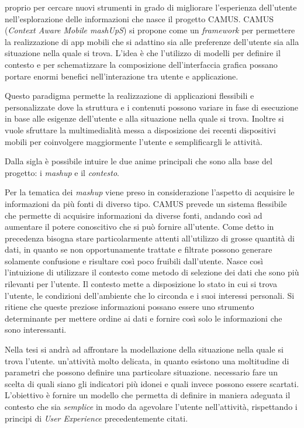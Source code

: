 \upe proprio per cercare nuovi strumenti in grado di migliorare l'esperienza dell'u\-ten\-te nell'esplorazione delle informazioni che nasce il progetto CAMUS. CAMUS (\emph{Context Aware Mobile mashUpS}) si propone come un \emph{framework} per permettere la realizzazione di app mobili che si adattino sia alle preferenze dell'utente sia alla situazione nella quale si trova. L'idea è che l'utilizzo di modelli per definire il contesto e per schematizzare la composizione dell'interfaccia grafica possano portare enormi benefici nell'interazione tra utente e applicazione.

Questo paradigma permette la realizzazione di applicazioni flessibili e personalizzate dove la struttura e i contenuti possono variare in fase di esecuzione in base alle esigenze dell'utente e alla situazione nella quale si trova. Inoltre si vuole sfruttare la multimedialità messa a disposizione dei recenti dispositivi mobili per coinvolgere maggiormente l'utente e semplificargli le attività.

Dalla sigla è possibile intuire le due anime principali che sono alla base del progetto: i \emph{mashup} e il \emph{contesto}.

Per la tematica dei \emph{mashup} viene preso in considerazione l'aspetto di acquisire le informazioni da più fonti di diverso tipo. CAMUS prevede un sistema flessibile che permette di acquisire informazioni da diverse fonti, andando così ad aumentare il potere conoscitivo che si può fornire all'utente. Come detto in precedenza bisogna stare particolarmente attenti all'utilizzo di grosse quantità di dati, in quanto se non opportunamente trattate e filtrate possono generare solamente confusione e risultare così poco fruibili dall'utente. Nasce così l'intuizione di utilizzare il contesto come metodo di selezione dei dati che sono più rilevanti per l'utente. Il contesto mette a disposizione lo stato in cui si trova l'utente, le condizioni dell'ambiente che lo circonda e i suoi interessi personali. Si ritiene che queste preziose informazioni possano essere uno strumento determinante per mettere ordine ai dati e fornire così solo le informazioni che sono interessanti.

Nella tesi si andrà ad affrontare la modellazione della situazione nella quale si trova l'utente. \upe un'attività molto delicata, in quanto esistono una moltitudine di parametri che possono definire una particolare situazione. \upe necessario fare un scelta di quali siano gli indicatori più idonei e quali invece possono essere scartati. L'obiettivo è fornire un modello che permetta di definire in maniera adeguata il contesto che sia \emph{semplice} in modo da agevolare l'utente nell'attività, rispettando i principi di \emph{User Experience} precedentemente citati.

